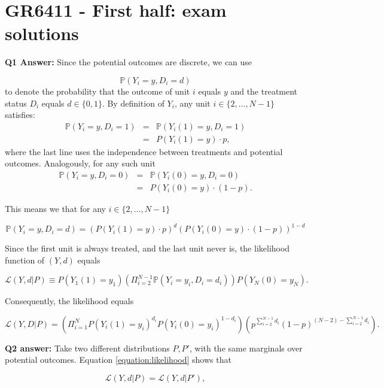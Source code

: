 \documentclass[11pt]{article} %
\begin{document}
\onehalfspace

\section{GR6411 - First half: exam solutions} 

\noindent \textbf{Q1 Answer:} Since the potential outcomes are discrete, we can use

\[  \mathbb{P} (Y_i = y, D_i = d)  \]
to denote the probability that the outcome of unit $i$ equals $y$ and the treatment status $D_i$ equals $d \in \{0,1\}$. By definition of $Y_i$, any unit $i \in \{2, \ldots, N-1\}$ satisfies:
\begin{eqnarray*}
\mathbb{P} (Y_i = y, D_i = 1) &=&  \mathbb{P}(Y_i(1) = y, D_i = 1)  \\
 &=&   P (Y_i(1) = y) \cdot p,  
\end{eqnarray*}
where the last line uses the independence between treatments and potential outcomes. Analogously, for any such unit
\begin{eqnarray*}
\mathbb{P} (Y_i = y, D_i = 0) &=&  \mathbb{P} (Y_i(0) = y, D_i = 0)   \\
 &=&   P (Y_i(0) = y) \cdot (1-p).
\end{eqnarray*}

\noindent This means we that for any $i \in \{2, \ldots, N-1\}$

 \[ \mathbb{P} (Y_i = y, D_i = d) =  \left(P (Y_i(1) = y) \cdot p\right)^{d}  \left(P (Y_i(0) = y) \cdot (1-p)\right)^{1-d}  \]

\noindent Since the first unit is always treated, and the last unit never is, the likelihood function of $(Y,d)$ equals

\[ \mathcal{L}(Y,d | P ) \equiv P(Y_1(1)=y_1) \left( \Pi_{i=2}^{N-1} \mathbb{P} (Y_i = y_i, D_i = d_i)   \right) P(Y_N(0)=y_N).   \]

Consequently,  the likelihood equals

\begin{equation} \label{equation:likelihood}
\mathcal{L}(Y,D | P) = \left( \Pi_{i=1}^{N} P(Y_i(1)=y_i)^{d_i} P(Y_i(0)=y_i)^{1-d_i} \right) \left( p^{\sum_{i=2}^{N-1} d_i }  (1-p)^{(N-2)-\sum_{i=2}^{N-1} d_i } \right).  
\end{equation}


\noindent \textbf{Q2 answer:} Take two different distributions $P,P'$, with the same marginals over potential outcomes. Equation \eqref{equation:likelihood} shows that 

\[ \mathcal{L}(Y,d | P ) = \mathcal{L}(Y,d | P' ),  \]
\end{document}
